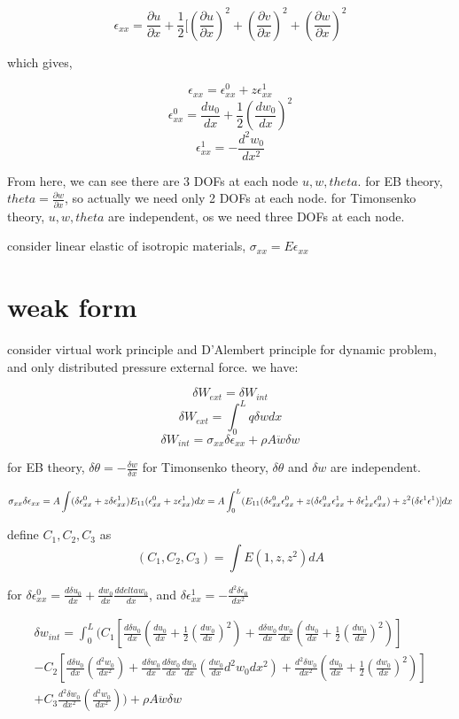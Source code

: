 \documentclass[11pt]{article}
\begin{document}
$$ \epsilon_{xx} = \frac{\partial u}{\partial x} + \frac{1}{2}[(\frac{\partial u}{\partial x})^2 + (\frac{\partial v}{\partial x})^2 + (\frac{\partial w}{\partial x})^2 $$

which gives,

$$ \epsilon_{xx} = \epsilon^0_{xx} + z \epsilon^1_{xx} $$
$$ \epsilon^0_{xx} = \frac{du_0}{dx} + \frac{1}{2} (\frac{dw_0}{dx})^2 $$
$$ \epsilon^1_{xx} = - \frac{d^2w_0}{dx^2} $$

From here, we can see there are 3 DOFs at each node $u, w, theta$. for EB theory, $ theta = \frac{\partial w}{\partial x} $, so actually we need only 2 DOFs at each node.
for Timonsenko theory, $u, w, theta$ are independent, os we need three DOFs at each node.

consider linear elastic of isotropic materials, $\sigma_{xx} = E \epsilon_{xx}$

\section{weak form}

consider virtual work principle and D'Alembert principle for dynamic problem, and only distributed pressure external force. we have:

$$ \delta W_{ext} = \delta W_{int} $$
$$ \delta W_{ext} = \int_0^L q\delta w dx$$
$$ \delta W_{int} = \sigma_{xx} \delta \epsilon_{xx} + \rho A \ddot{w} \delta w $$

for EB theory, $\delta \theta = - \frac{\delta w}{\delta x} $
for Timonsenko theory, $\delta \theta$ and $\delta w$ are independent.


$$ 	 \sigma_{xx} \delta \epsilon_{xx} = A \int ( \delta \epsilon^0_{xx} + z \delta \epsilon^1_{xx}) E_{11} (\epsilon^0_{xx} + z \epsilon^1_{xx}) dx  \\
   = A \int^L_0 ( E_{11} (\delta \epsilon^0_{xx} \epsilon^0_{xx} + z(\delta \epsilon^0_{xx} \epsilon^1_{xx} + \delta \epsilon^1_{xx} \epsilon^0_{xx}) + z^2(\delta \epsilon^1 \epsilon^1)]dx 
$$

define $C_1, C_2, C_3$ as 
$$ ( C_1, C_2, C_3) = \int E (1, z, z^2) dA $$


for $ \delta \epsilon^0_{xx} = \frac{d \delta u_0}{dx} + \frac{dw_0}{dx} \frac{d delta w_0}{dx} $, and $ \delta \epsilon^1_{xx} = - \frac{d^2 \delta \epsilon_0}{d x^2} $

\begin{multline}
 \delta w_{int} = \int_0^L ( C_1 [ \frac{d \delta u_0}{dx} ( \frac{du_0}{dx} + \frac{1}{2} (\frac{dw_0}{dx})^2) + \frac{d \delta w_0}{dx} \frac{dw_0}{dx} (\frac{du_0}{dx} + \frac{1}{2}(\frac{dw_0}{dx})^2)] \\
  - C_2 [\frac{d \delta u_0}{dx} (\frac{d^2w_0}{dx^2}) + \frac{d \delta w_0}{dx} \frac{d \delta w_0}{dx}  \frac{dw_0}{dx}(\frac{dw_0}{dx}{d^2w_0}{dx^2}) + \frac{d^2 \delta w_0}{dx^2} ( \frac{du_0}{dx} + \frac{1}{2} (\frac{dw_0}{dx})^2)] \\
  + C_3 \frac{d^2 \delta w_0}{dx^2} (\frac{d^2w_0}{dx^2})) +  \rho A \ddot{w} \delta w 
\end{multline}
\end{document}

